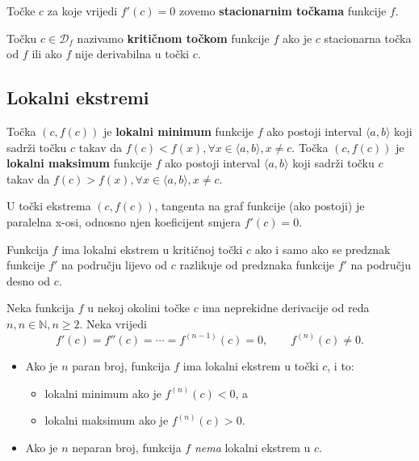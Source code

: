 Točke $c$ za koje vrijedi $f'(c)=0$ zovemo \textbf{stacionarnim točkama}
funkcije $f$.

Točku $c\in \mathcal{D}_f$ nazivamo \textbf{kritičnom točkom} funkcije $f$ ako
je $c$ stacionarna točka od $f$ ili ako $f$ nije derivabilna u točki $c$.

\subsection{Lokalni ekstremi}

\begin{definitionbox}
    Točka $(c, f(c))$ je \textbf{lokalni minimum} funkcije $f$ ako postoji
    interval $\langle a,b \rangle$ koji sadrži točku $c$ takav da
    $f(c)<f(x),\forall x \in \langle a,b \rangle, x\neq c$.
    Točka $(c, f(c))$ je \textbf{lokalni maksimum} funkcije $f$ ako postoji
    interval $\langle a,b \rangle$ koji sadrži točku $c$ takav da
    $f(c)>f(x),\forall x \in \langle a,b \rangle, x\neq c$.
\end{definitionbox}

U točki ekstrema $(c, f(c))$, tangenta na graf funkcije (ako postoji) je
paralelna x-osi, odnosno njen koeficijent smjera $f'(c) = 0$.

Funkcija $f$ ima lokalni ekstrem u kritičnoj točki $c$ ako i samo ako se
predznak funkcije $f'$ na području lijevo od $c$ razlikuje od predznaka funkcije
$f'$ na području desno od $c$.

\begin{theorembox}
    Neka funkcija $f$ u nekoj okolini točke $c$ ima neprekidne derivacije od
    reda $n, n\in\mathbb{N},n\geq 2$.
    Neka vrijedi
    $$
    f'(c)=f''(c)=\cdots=f^{(n-1)}(c)=0,\qquad f^{(n)}(c)\neq 0.
    $$

    \begin{itemize}
        \item Ako je $n$ paran broj, funkcija $f$ ima lokalni ekstrem u točki $c$, i to:
        \begin{itemize}
            \item lokalni minimum ako je $f^{(n)}(c)<0$, a
            \item lokalni maksimum ako je $f^{(n)}(c)>0$.
        \end{itemize}
        \item Ako je $n$ neparan broj, funkcija $f$ \textit{nema} lokalni
        ekstrem u $c$.
    \end{itemize}
\end{theorembox}

